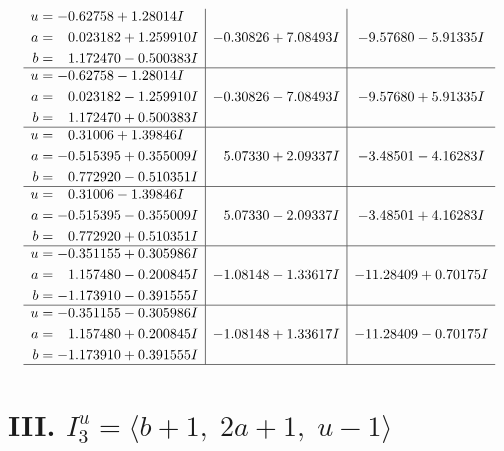 \documentclass[1p]{elsarticle_modified}
\theoremstyle{definition}
\begin{document}
$$\begin{array}{c|c|c}
\begin{aligned}
u &= -0.62758 + 1.28014 I \\
a &= \phantom{-}0.023182 + 1.259910 I \\
b &= \phantom{-}1.172470 - 0.500383 I\end{aligned}
 & -0.30826 + 7.08493 I & -9.57680 - 5.91335 I \\ \hline\begin{aligned}
u &= -0.62758 - 1.28014 I \\
a &= \phantom{-}0.023182 - 1.259910 I \\
b &= \phantom{-}1.172470 + 0.500383 I\end{aligned}
 & -0.30826 - 7.08493 I & -9.57680 + 5.91335 I \\ \hline\begin{aligned}
u &= \phantom{-}0.31006 + 1.39846 I \\
a &= -0.515395 + 0.355009 I \\
b &= \phantom{-}0.772920 - 0.510351 I\end{aligned}
 & \phantom{-}5.07330 + 2.09337 I & -3.48501 - 4.16283 I \\ \hline\begin{aligned}
u &= \phantom{-}0.31006 - 1.39846 I \\
a &= -0.515395 - 0.355009 I \\
b &= \phantom{-}0.772920 + 0.510351 I\end{aligned}
 & \phantom{-}5.07330 - 2.09337 I & -3.48501 + 4.16283 I \\ \hline\begin{aligned}
u &= -0.351155 + 0.305986 I \\
a &= \phantom{-}1.157480 - 0.200845 I \\
b &= -1.173910 - 0.391555 I\end{aligned}
 & -1.08148 - 1.33617 I & -11.28409 + 0.70175 I \\ \hline\begin{aligned}
u &= -0.351155 - 0.305986 I \\
a &= \phantom{-}1.157480 + 0.200845 I \\
b &= -1.173910 + 0.391555 I\end{aligned}
 & -1.08148 + 1.33617 I & -11.28409 - 0.70175 I\\
 \hline 
 \end{array}$$\newpage\newpage\renewcommand{\arraystretch}{1}
\centering \section*{III. $I^u_{3}= \langle b+1,\;2 a+1,\;u-1 \rangle$}
\end{document}
